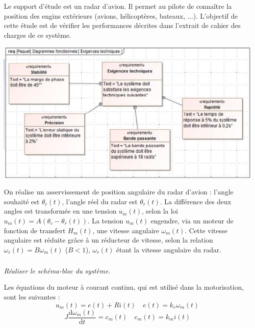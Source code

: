 \documentclass[10pt,fleqn]{article} %
\begin{document}

\vspace{5cm}
\pagestyle{fancy}
\thispagestyle{plain}

\def\columnseprulecolor{\color{ocre}}
\setlength{\columnseprule}{0.4pt} 

\def\pathfig{images}

\begin{multicols}{2}
Le support d'étude est un radar d'avion. Il permet au pilote de connaître la position des engins extérieurs (avions, hélicoptères, bateaux, ...). L'objectif de cette étude est de vérifier les performances décrites dans l’extrait de cahier des charges de ce système. 

\begin{center}
\includegraphics[width=\linewidth]{images/fig_02}
\end{center}

On réalise un asservissement de position angulaire du radar d’avion : l'angle souhaité est $\theta_c (t)$, l'angle réel du radar est $\theta_r (t)$. La différence des deux angles est transformée en une tension $u_m (t)$, selon la loi $u_m (t)= A(\theta_c - \theta_r (t))$. La tension $u_m (t)$ engendre, via un moteur de fonction de transfert $H_m (t)$, une vitesse angulaire $\omega_m (t)$. Cette vitesse angulaire est réduite grâce à un réducteur de vitesse, selon la relation $\omega_r (t) = B \omega_m (t)$ ($B<1$), $\omega_r (t)$ étant la vitesse angulaire du radar. 

\subparagraph{}\textit{Réaliser le schéma-bloc du système. }

Les équations du moteur à courant continu, qui est utilisé dans la motorisation, sont les suivantes : 
$$
u_m(t)=e(t)+Ri(t) 
\quad e(t)=k_e\omega_m(t) 
$$
$$J \dfrac{\text{d}\omega_m(t)}{\text{d}t} = c_m(t)
\quad c_m(t) = k_m i(t)
$$



\end{multicols}
\end{document}
